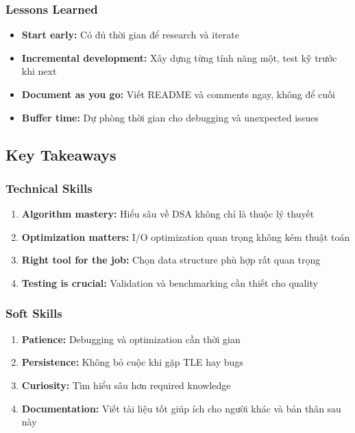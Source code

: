 \documentclass[12pt,a4paper]{article}
\begin{document}
\subsubsection{Lessons Learned}
\begin{itemize}
    \item \textbf{Start early:} Có đủ thời gian để research và iterate
    \item \textbf{Incremental development:} Xây dựng từng tính năng một, test kỹ trước khi next
    \item \textbf{Document as you go:} Viết README và comments ngay, không để cuối
    \item \textbf{Buffer time:} Dự phòng thời gian cho debugging và unexpected issues
\end{itemize}

\subsection{Key Takeaways}

\subsubsection{Technical Skills}
\begin{enumerate}
    \item \textbf{Algorithm mastery:} Hiểu sâu về DSA không chỉ là thuộc lý thuyết
    \item \textbf{Optimization matters:} I/O optimization quan trọng không kém thuật toán
    \item \textbf{Right tool for the job:} Chọn data structure phù hợp rất quan trọng
    \item \textbf{Testing is crucial:} Validation và benchmarking cần thiết cho quality
\end{enumerate}

\subsubsection{Soft Skills}
\begin{enumerate}
    \item \textbf{Patience:} Debugging và optimization cần thời gian
    \item \textbf{Persistence:} Không bỏ cuộc khi gặp TLE hay bugs
    \item \textbf{Curiosity:} Tìm hiểu sâu hơn required knowledge
    \item \textbf{Documentation:} Viết tài liệu tốt giúp ích cho người khác và bản thân sau này
\end{enumerate}
\end{document}
